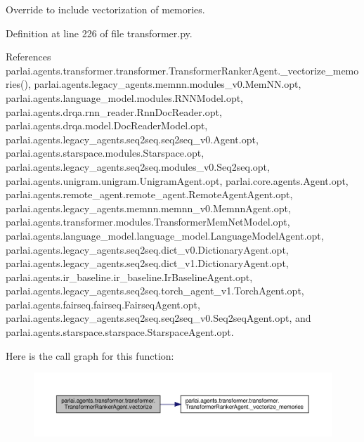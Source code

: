 \begin{DoxyVerb}Override to include vectorization of memories.\end{DoxyVerb}
 

Definition at line 226 of file transformer.\+py.



References parlai.\+agents.\+transformer.\+transformer.\+Transformer\+Ranker\+Agent.\+\_\+vectorize\+\_\+memories(), parlai.\+agents.\+legacy\+\_\+agents.\+memnn.\+modules\+\_\+v0.\+Mem\+N\+N.\+opt, parlai.\+agents.\+language\+\_\+model.\+modules.\+R\+N\+N\+Model.\+opt, parlai.\+agents.\+drqa.\+rnn\+\_\+reader.\+Rnn\+Doc\+Reader.\+opt, parlai.\+agents.\+drqa.\+model.\+Doc\+Reader\+Model.\+opt, parlai.\+agents.\+legacy\+\_\+agents.\+seq2seq.\+seq2seq\+\_\+v0.\+Agent.\+opt, parlai.\+agents.\+starspace.\+modules.\+Starspace.\+opt, parlai.\+agents.\+legacy\+\_\+agents.\+seq2seq.\+modules\+\_\+v0.\+Seq2seq.\+opt, parlai.\+agents.\+unigram.\+unigram.\+Unigram\+Agent.\+opt, parlai.\+core.\+agents.\+Agent.\+opt, parlai.\+agents.\+remote\+\_\+agent.\+remote\+\_\+agent.\+Remote\+Agent\+Agent.\+opt, parlai.\+agents.\+legacy\+\_\+agents.\+memnn.\+memnn\+\_\+v0.\+Memnn\+Agent.\+opt, parlai.\+agents.\+transformer.\+modules.\+Transformer\+Mem\+Net\+Model.\+opt, parlai.\+agents.\+language\+\_\+model.\+language\+\_\+model.\+Language\+Model\+Agent.\+opt, parlai.\+agents.\+legacy\+\_\+agents.\+seq2seq.\+dict\+\_\+v0.\+Dictionary\+Agent.\+opt, parlai.\+agents.\+legacy\+\_\+agents.\+seq2seq.\+dict\+\_\+v1.\+Dictionary\+Agent.\+opt, parlai.\+agents.\+ir\+\_\+baseline.\+ir\+\_\+baseline.\+Ir\+Baseline\+Agent.\+opt, parlai.\+agents.\+legacy\+\_\+agents.\+seq2seq.\+torch\+\_\+agent\+\_\+v1.\+Torch\+Agent.\+opt, parlai.\+agents.\+fairseq.\+fairseq.\+Fairseq\+Agent.\+opt, parlai.\+agents.\+legacy\+\_\+agents.\+seq2seq.\+seq2seq\+\_\+v0.\+Seq2seq\+Agent.\+opt, and parlai.\+agents.\+starspace.\+starspace.\+Starspace\+Agent.\+opt.

Here is the call graph for this function\+:
\nopagebreak
\begin{figure}[H]
\begin{center}
\leavevmode
\includegraphics[width=350pt]{classparlai_1_1agents_1_1transformer_1_1transformer_1_1TransformerRankerAgent_a76ba1a57647f32877fce85a064952c5d_cgraph}
\end{center}
\end{figure}


